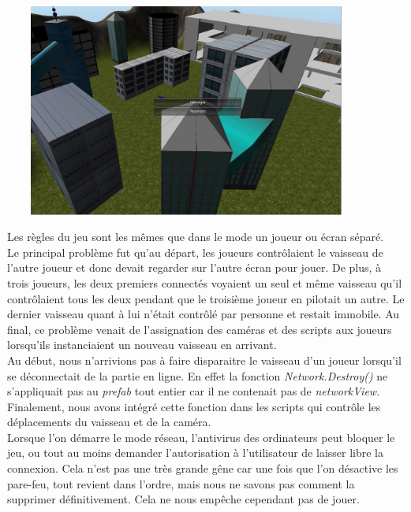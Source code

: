 \documentclass[10pt, titlepage]{report}
\begin{document}
\begin{center}
\includegraphics[height=7cm, width=12cm]{lan.jpg}
\end{center}

Les règles du jeu sont les mêmes que dans le mode un joueur ou écran séparé.\\

Le principal problème fut qu'au départ, les joueurs contrôlaient le vaisseau de l'autre joueur et donc devait regarder sur l'autre écran pour jouer. De plus, à trois joueurs, les deux premiers connectés voyaient un seul et même vaisseau qu'il contrôlaient tous les deux pendant que le troisième joueur en pilotait un autre. Le dernier vaisseau quant à lui n'était contrôlé par personne et restait immobile. Au final, ce problème venait de l'assignation des caméras et des scripts aux joueurs lorsqu'ils instanciaient un nouveau vaisseau en arrivant.\\

Au début, nous n'arrivions pas à faire disparaitre le vaisseau d'un joueur lorsqu'il se déconnectait de la partie en ligne. En effet la fonction \textit{Network.Destroy()} ne s'appliquait pas au \textit{prefab} tout entier car il ne contenait pas de \textit{networkView}. Finalement, nous avons intégré cette fonction dans les scripts qui contrôle les déplacements du vaisseau et de la caméra.\\

Lorsque l'on démarre le mode réseau, l'antivirus des ordinateurs peut bloquer le jeu, ou tout au moins demander l'autorisation à l'utilisateur de laisser libre la connexion. Cela n'est pas une très grande gêne car une fois que l'on désactive les pare-feu, tout revient dans l'ordre, mais nous ne savons pas comment la supprimer définitivement. Cela ne nous empêche cependant pas de jouer.\\
\end{document}
